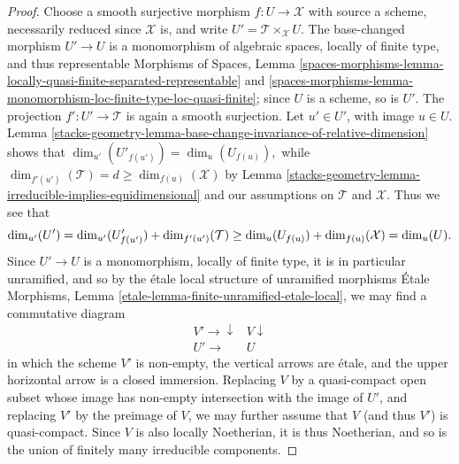 \begin{proof}
Choose a smooth surjective morphism $f:U \to \mathcal{X}$ with source a scheme,
necessarily reduced since $\mathcal{X}$ is,
and write $U' = \mathcal{T}\times_{\mathcal{X}} U$.  The base-changed morphism
$U' \to U$ is a monomorphism of algebraic spaces, locally of finite
type, and thus representable
Morphisms of Spaces, Lemma
\ref{spaces-morphisms-lemma-locally-quasi-finite-separated-representable} and
\ref{spaces-morphisms-lemma-monomorphism-loc-finite-type-loc-quasi-finite};
since $U$ is a scheme, so is $U'$.
The projection $f': U' \to \mathcal{T}$ is again a smooth surjection.
Let $u' \in U'$, with image $u \in U$.
Lemma \ref{stacks-geometry-lemma-base-change-invariance-of-relative-dimension}
shows that $\dim_{u'}(U'_{f(u')}) = \dim_u(U_{f(u)}),$
while $\dim_{f'(u')}(\mathcal{T}) =d
\geq \dim_{f(u)}(\mathcal{X})$ by
Lemma \ref{stacks-geometry-lemma-irreducible-implies-equidimensional}
and our assumptions on $\mathcal{T}$ and $\mathcal{X}$.
Thus we see that
\begin{equation}
\label{equation-dim-inequality}
\dim_{u'} (U') = \dim_{u'} (U'_{f(u')}) + \dim_{f'(u')}(\mathcal{T})
\\
\geq \dim_u (U_{f(u)}) + \dim_{f(u)}(\mathcal{X}) = \dim_u (U).
\end{equation}
Since $U' \to U$ is a monomorphism, locally of finite type,
it is in particular unramified,
and so by the \'etale local structure of unramified morphisms
\'Etale Morphisms, Lemma \ref{etale-lemma-finite-unramified-etale-local},
we may find a commutative diagram
$$
\begin{array}{cc}V' \longrightarrow\downarrow & V \downarrow \\ U' \longrightarrow & U\end{array}
$$
in which the scheme $V'$ is non-empty,
the vertical arrows are \'etale,
and the upper horizontal arrow is a closed immersion.
Replacing $V$ by a quasi-compact open subset
whose image has non-empty intersection with the image of $U'$,
and replacing $V'$ by the preimage of $V$, we may further
assume that $V$ (and thus $V'$) is quasi-compact.
Since $V$ is also locally Noetherian,
it is thus Noetherian, and so is the union of finitely many irreducible
components.


\end{proof}
